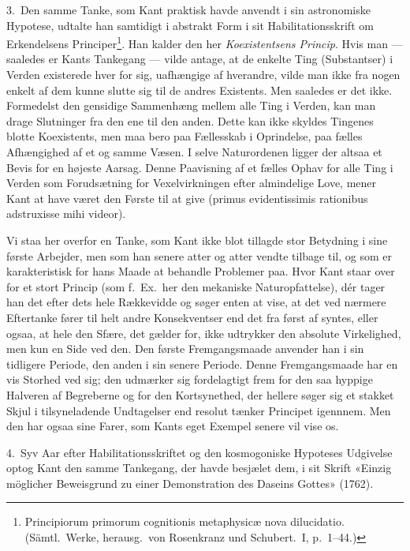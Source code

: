 \documentclass[12pt,a4paper]{article}
\newcommand{\apage}[1]{\marginnote{\footnotesize\textit{[#1]}}}
\begin{document}
3.\ Den samme Tanke, som Kant praktisk havde anvendt i sin astronomiske
Hypotese, udtalte han samtidigt i abstrakt Form i sit Habilitationsskrift
om Erkendelsens Principer\footnote{Principiorum primorum
cognitionis metaphysicæ nova dilucidatio. (Sämtl.\ Werke, herausg.\ von
Rosenkranz und Schubert.\ I, p.\ 1--44.)}. Han kalder den her
\emph{Koexistentsens Princip}. Hvis man --- saaledes er Kants Tankegang --- vilde
antage, at de enkelte Ting (Substantser) i Verden existerede hver for
sig, uafhængige af hverandre, vilde man ikke fra nogen enkelt af dem
kunne slutte sig til de andres Existents. Men saaledes er det ikke.
Formedelst den gensidige \apage{11}  Sammenhæng mellem alle Ting i Verden, kan man
drage Slutninger fra den ene til den anden. Dette kan ikke skyldes
Tingenes blotte Koexistents, men maa bero paa Fællesskab i Oprindelse,
paa fælles Afhængighed af et og samme Væsen. I selve Naturordenen ligger
der altsaa et Bevis for en højeste Aarsag. Denne Paavisning af et fælles
Ophav for alle Ting i Verden som Forudsætning for Vexelvirkningen efter
almindelige Love, mener Kant at have været den Første til at give
(primus evidentissimis rationibus adstruxisse mihi videor).

Vi staa her overfor en Tanke, som Kant ikke blot tillagde stor Betydning
i sine første Arbejder, men som han senere atter og atter vendte tilbage
til, og som er karakteristisk for hans Maade at behandle Problemer paa.
Hvor Kant staar over for et stort Princip (som f.\ Ex.\ her den mekaniske
Naturopfattelse), dér tager han det efter dets hele Rækkevidde og søger
enten at vise, at det ved nærmere Eftertanke fører til helt andre
Konsekventser end det fra først af syntes, eller ogsaa, at hele den
Sfære, det gælder for, ikke udtrykker den absolute Virkelighed, men kun
en Side ved den. Den første Fremgangsmaade anvender han i sin tidligere
Periode, den anden i sin senere Periode. Denne Fremgangsmaade har en vis
Storhed ved sig; den udmærker sig fordelagtigt frem for den saa hyppige
Halveren af Begreberne og for den Kortsynethed, der hellere søger sig et
stakket Skjul i tilsyneladende Undtagelser end resolut tænker Principet
igennnem. Men den har ogsaa sine Farer, som Kants eget Exempel senere vil
vise os.

4.\ Syv Aar efter Habilitationsskriftet og den kosmogoniske Hypoteses
Udgivelse optog Kant den samme Tankegang, der havde besjælet dem, i sit
Skrift «Einzig möglicher Beweisgrund zu einer Demonstration des Daseins
Gottes» (1762).
\end{document}
